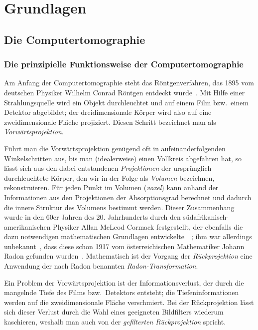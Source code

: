 \chapter{Grundlagen}

\section{Die Computertomographie}

\subsection{Die prinzipielle Funktionsweise der Computertomographie}

Am Anfang der Computertomographie steht das Röntgenverfahren, das 1895 vom deutschen Physiker Wilhelm Conrad Röntgen
entdeckt wurde~\cite{roentgen}. Mit Hilfe einer Strahlungsquelle wird ein Objekt durchleuchtet und auf einem Film bzw.\
einem Detektor abgebildet; der dreidimensionale Körper wird also auf eine zweidimensionale Fläche projiziert. Diesen
Schritt bezeichnet man als \textit{Vorwärtsprojektion}.

Führt man die Vorwärtsprojektion genügend oft in aufeinanderfolgenden Winkelschritten aus, bis man (idealerweise) einen
Vollkreis abgefahren hat, so lässt sich aus den dabei entstandenen \textit{Projektionen} der ursprünglich durchleuchtete
Körper, den wir in der Folge als \textit{Volumen} bezeichnen, rekonstruieren. Für jeden Punkt im Volumen
(\textit{\gls{voxel}}) kann anhand der Informationen aus den Projektionen der Absorptionsgrad berechnet und dadurch die
innere Struktur des Volumens bestimmt werden. Dieser Zusammenhang wurde in den 60er Jahren des 20. Jahrhunderts durch
den südafrikanisch-amerikanischen Physiker Allan McLeod Cormack festgestellt, der ebenfalls die dazu notwendigen
mathematischen Grundlagen entwickelte~\cite{cormack63}~\cite{cormack64}; ihm war allerdings unbekannt~\cite{cormack79},
dass diese schon 1917 vom österreichischen Mathematiker Johann Radon gefunden wurden~\cite{radon}. Mathematisch ist der
Vorgang der \textit{Rückprojektion} eine Anwendung der nach Radon benannten \textit{Radon-Transformation}.

Ein Problem der Vorwärtsprojektion ist der Informationsverlust, der durch die mangelnde Tiefe des Films bzw.\ Detektors
entsteht; die Tiefeninformationen werden auf die zweidimensionale Fläche {\glqq}verschmiert{\grqq}. Bei der
Rückprojektion lässt sich dieser Verlust durch die Wahl eines geeigneten Bildfilters wiederum kaschieren, weshalb man
auch von der \textit{gefilterten Rückprojektion} spricht.

